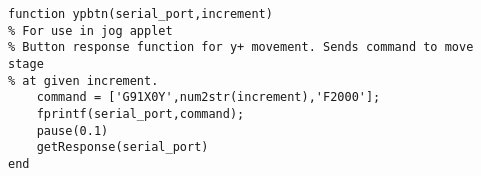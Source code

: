 \begin{lstlisting}
function ypbtn(serial_port,increment)
% For use in jog applet
% Button response function for y+ movement. Sends command to move stage
% at given increment.
    command = ['G91X0Y',num2str(increment),'F2000'];
    fprintf(serial_port,command);
    pause(0.1)
    getResponse(serial_port)
end

\end{lstlisting}